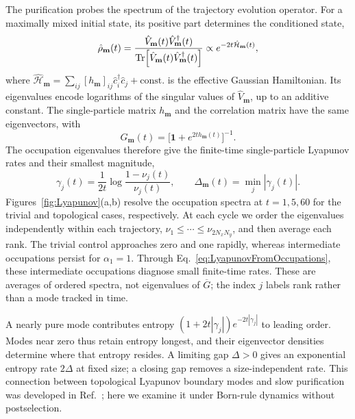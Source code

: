 \documentclass[aps,prb,10pt,twocolumn,superscriptaddress,longbibliography,floatfix]{revtex4-2}
\newcommand{\rec}{\mathbf m}   %
\begin{document}
{The purification probes the spectrum of the trajectory evolution operator. For a maximally mixed initial state, its positive part determines the conditioned state,
\begin{equation}
 \hat\rho_{\rec}(t)=\frac{\hat V_{\rec}(t)\hat V_{\rec}^\dagger(t)}
 {\Tr[\hat V_{\rec}(t)\hat V_{\rec}^\dagger(t)]}
 \propto e^{-2t\hat{\mathcal H}_{\rec}(t)},
 \label{eq:PurificationKrausProduct}
\end{equation}
where $\hat{\mathcal H}_{\rec}=\sum_{ij}[h_{\rec}]_{ij}\hat c_i^\dagger\hat c_j+\mathrm{const.}$ is the effective Gaussian Hamiltonian. Its eigenvalues encode logarithms of the singular values of $\hat V_{\rec}$, up to an additive constant. The single-particle matrix $h_{\rec}$ and the correlation matrix have the same eigenvectors, with
\begin{equation}
 G_{\rec}(t)=\big[\mathbf{1}+e^{2t h_{\rec}(t)}\big]^{-1}.
 \label{eq:PurificationFermiFunction}
\end{equation}
The occupation eigenvalues therefore give the finite-time single-particle Lyapunov rates and their smallest magnitude,
\begin{equation}
 \gamma_j(t)=\frac{1}{2t}\log\frac{1-\nu_j(t)}{\nu_j(t)},\qquad
 \Delta_{\rec}(t)=\min_j|\gamma_j(t)|.
 \label{eq:LyapunovFromOccupations}
\end{equation}
Figures~\ref{fig:Lyapunov}(a,b) resolve the occupation spectra at $t=1,5,60$ for the trivial and topological cases, respectively. At each cycle we order the eigenvalues independently within each trajectory, $\nu_1\leq\cdots\leq\nu_{2N_xN_y}$, and then average each rank. The trivial control approaches zero and one rapidly, whereas intermediate occupations persist for $\alpha_1=1$. Through Eq.~\eqref{eq:LyapunovFromOccupations}, these intermediate occupations diagnose small finite-time rates. These are averages of ordered spectra, not eigenvalues of $\overline G$; the index $j$ labels rank rather than a mode tracked in time.

A nearly pure mode contributes entropy $(1+2t|\gamma_j|)e^{-2t|\gamma_j|}$ to leading order. Modes near zero thus retain entropy longest, and their eigenvector densities determine where that entropy resides. A limiting gap $\Delta>0$ gives an exponential entropy rate $2\Delta$ at fixed size; a closing gap removes a size-independent rate. This connection between topological Lyapunov boundary modes and slow purification was developed in Ref.~\cite{XiaoKawabata2026}; here we examine it under Born-rule dynamics without postselection.

}
\end{document}
